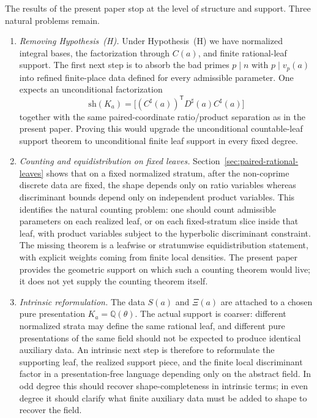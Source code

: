 \documentclass[11pt,letterpaper]{amsart}
\newcommand{\Q}{\mathbb{Q}}
\newcommand{\sh}{\mathrm{sh}}
\theoremstyle{plain}
\theoremstyle{definition}
\begin{document}
The results of the present paper stop at the level of structure and support.
Three natural problems remain.
\begin{enumerate}
    \item \emph{Removing Hypothesis~\textup{(H)}.}
Under Hypothesis~\textup{(H)} we have normalized integral bases, the
factorization through \(C(a)\), and finite rational-leaf support.  The first
next step is to absorb the bad primes \(p\mid n\) with \(p\mid v_p(a)\) into
refined finite-place data defined for every admissible parameter.  One expects
an unconditional factorization
\[
\sh(K_a)=\bigl[(C^\sharp(a))^{\mathsf T}D^\sharp(a)C^\sharp(a)\bigr]
\]
together with the same paired-coordinate ratio/product separation as in the
present paper.  Proving this would upgrade the unconditional countable-leaf
support theorem to unconditional finite leaf support in every fixed degree.
\item \emph{Counting and equidistribution on fixed leaves.}
Section~\ref{sec:paired-rational-leaves} shows that on a fixed normalized
stratum, after the non-coprime discrete data are fixed, the shape depends only
on ratio variables whereas discriminant bounds depend only on independent
product variables.  This identifies the natural counting problem: one should
count admissible parameters on each realized leaf, or on each fixed-stratum
slice inside that leaf, with product variables subject to the hyperbolic
discriminant constraint.  The missing theorem is a leafwise or stratumwise
equidistribution statement, with explicit weights coming from finite local
densities.  The present paper provides the geometric support on which such a
counting theorem would live; it does not yet supply the counting theorem
itself.
\item \emph{Intrinsic reformulation.}
The data \(S(a)\) and \(\Xi(a)\) are attached to a chosen pure presentation
\(K_a=\Q(\theta)\).  The actual support is coarser: different normalized strata
may define the same rational leaf, and different pure presentations of the same
field should not be expected to produce identical auxiliary data.  An intrinsic
next step is therefore to reformulate the supporting leaf, the realized support
piece, and the finite local discriminant factor in a presentation-free language
depending only on the abstract field.  In odd degree this should recover
shape-completeness in intrinsic terms; in even degree it should clarify what
finite auxiliary data must be added to shape to recover the field.
\end{enumerate}







\end{document}
